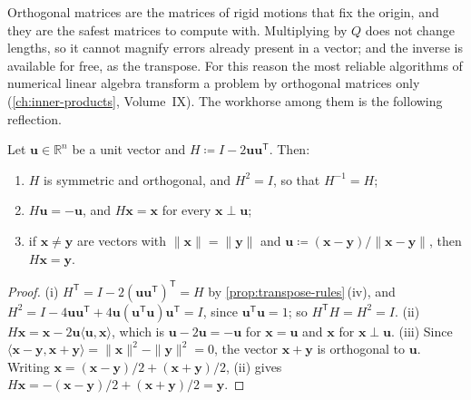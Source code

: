 Orthogonal matrices are the matrices of rigid motions that fix the origin, and they are the safest matrices to compute with. Multiplying by $Q$ does not change lengths, so it cannot magnify errors already present in a vector; and the inverse is available for free, as the transpose. For this reason the most reliable algorithms of numerical linear algebra transform a problem by orthogonal matrices only (\cref{ch:inner-products}, Volume~IX). The workhorse among them is the following reflection.

\begin{proposition}
\label{prop:householder}
Let $\mathbf u\in\mathbb R^n$ be a unit vector and $H\coloneqq I-2\mathbf u\mathbf u^{\mathsf T}$. Then:
\begin{enumerate}
\item $H$ is symmetric and orthogonal, and $H^2=I$, so that $H^{-1}=H$;
\item $H\mathbf u=-\mathbf u$, and $H\mathbf x=\mathbf x$ for every $\mathbf x\perp\mathbf u$;
\item if $\mathbf x\ne\mathbf y$ are vectors with $\|\mathbf x\|=\|\mathbf y\|$ and $\mathbf u\coloneqq(\mathbf x-\mathbf y)/\|\mathbf x-\mathbf y\|$, then $H\mathbf x=\mathbf y$.
\end{enumerate}
\end{proposition}

\begin{proof}
(i) $H^{\mathsf T}=I-2(\mathbf u\mathbf u^{\mathsf T})^{\mathsf T}=H$ by \cref{prop:transpose-rules}\,(iv), and $H^2=I-4\mathbf u\mathbf u^{\mathsf T}+4\mathbf u(\mathbf u^{\mathsf T}\mathbf u)\mathbf u^{\mathsf T}=I$, since $\mathbf u^{\mathsf T}\mathbf u=1$; so $H^{\mathsf T}H=H^2=I$. (ii) $H\mathbf x=\mathbf x-2\mathbf u\langle\mathbf u,\mathbf x\rangle$, which is $\mathbf u-2\mathbf u=-\mathbf u$ for $\mathbf x=\mathbf u$ and $\mathbf x$ for $\mathbf x\perp\mathbf u$. (iii) Since $\langle\mathbf x-\mathbf y,\mathbf x+\mathbf y\rangle=\|\mathbf x\|^2-\|\mathbf y\|^2=0$, the vector $\mathbf x+\mathbf y$ is orthogonal to $\mathbf u$. Writing $\mathbf x=(\mathbf x-\mathbf y)/2+(\mathbf x+\mathbf y)/2$, (ii) gives $H\mathbf x=-(\mathbf x-\mathbf y)/2+(\mathbf x+\mathbf y)/2=\mathbf y$.
\end{proof}

